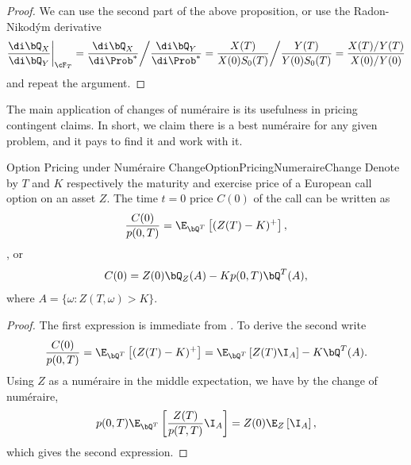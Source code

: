 \begin{proof}
	We can use the second part of the above proposition, or use the Radon-Nikodým derivative
	\[
		\frac{\di \bQ_X}{\di \bQ_Y} \bigg|_{\cF_T} = \frac{\di \bQ_X}{\di \Prob^*} \bigg/ \frac{\di \bQ_Y}{\di \Prob^*} = \frac{X(T)}{X(0)S_0(T)} \bigg/ \frac{Y(T)}{Y(0)S_0(T)} = \frac{X(T)/Y(T)}{X(0)/Y(0)}
	\]
	and repeat the argument.
\end{proof}

The main application of changes of num\'{e}raire is its usefulness in pricing contingent claims. In short, we claim there is a best num\'{e}raire for any given problem, and it pays to find it and work with it.

\begin{prop}{Option Pricing under Numéraire Change}{OptionPricingNumeraireChange}
	Denote by \(T\) and \(K\) respectively the maturity and exercise price of a European call option on an asset \(Z\). The time \(t=0\) price \(C(0)\) of the call can be written as
	\[
		\frac{C(0)}{p(0,T)} = \E_{\bQ^T} \left[ (Z(T) - K)^+ \right],
	\],
	or
	\[
		C(0) = Z(0)\bQ_Z(A) - Kp(0,T)\bQ^T(A),
	\]
	where \(A = \{ \omega : Z(T, \omega) > K \}\).
\end{prop}

\begin{proof}
	The first expression is immediate from . To derive the second write
	\[
		\frac{C(0)}{p(0,T)} = \E_{\bQ^T} \left[ (Z(T) - K)^+ \right] = \E_{\bQ^T} \left[ Z(T)\I_A \right] - K\bQ^T(A).
	\]
	Using \(Z\) as a numéraire in the middle expectation, we have by the change of numéraire, 
	\[
		p(0,T)\E_{\bQ^T} \left[ \frac{Z(T)}{p(T,T)} \I_A \right] = Z(0)\E_Z \left[ \I_A \right],
	\]
	which gives the second expression.
\end{proof}


